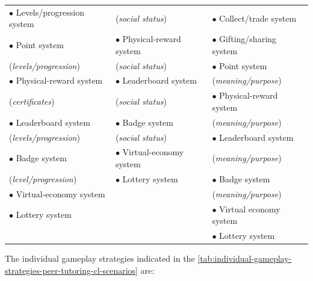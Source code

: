 \begin{quadro}[htb]
\begin{tabular}{l|l|l}
$\bullet$ Levels/progression system&
(\emph{social status})&
$\bullet$ Collect/trade system\tabularnewline

$\bullet$ Point system&
$\bullet$ Physical-reward system&
$\bullet$ Gifting/sharing system\tabularnewline

(\emph{levels/progression})&
(\emph{social status})&
$\bullet$ Point system\tabularnewline

$\bullet$ Physical-reward system&
$\bullet$ Leaderboard system&
(\emph{meaning/purpose})\tabularnewline

(\emph{certificates})&
(\emph{social status})&
$\bullet$ Physical-reward system\tabularnewline

$\bullet$ Leaderboard system&
$\bullet$ Badge system&
(\emph{meaning/purpose})\tabularnewline

(\emph{levels/progression})&
(\emph{social status})&
$\bullet$ Leaderboard system\tabularnewline

$\bullet$ Badge system&
$\bullet$ Virtual-economy system&
(\emph{meaning/purpose})\tabularnewline

(\emph{level/progression})&
$\bullet$ Lottery system&
$\bullet$ Badge system\tabularnewline

$\bullet$ Virtual-economy system&
&
(\emph{meaning/purpose})\tabularnewline

$\bullet$ Lottery system&
&
$\bullet$ Virtual economy system\tabularnewline

&
&
$\bullet$ Lottery system\tabularnewline

\hline
\end{tabular}
 \fautor
\end{quadro}


The individual gameplay strategies indicated in the \autoref{tab:individual-gameplay-strategies-peer-tutoring-cl-scenarios} are:


